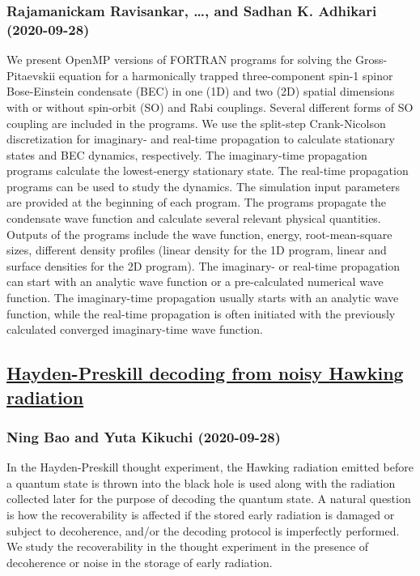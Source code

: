 \subsubsection*{Rajamanickam Ravisankar, \dots, and Sadhan K. Adhikari (2020-09-28)}
We present OpenMP versions of FORTRAN programs for solving the
Gross-Pitaevskii equation for a harmonically trapped three-component spin-1
spinor Bose-Einstein condensate (BEC) in one (1D) and two (2D) spatial
dimensions with or without spin-orbit (SO) and Rabi couplings. Several
different forms of SO coupling are included in the programs. We use the
split-step Crank-Nicolson discretization for imaginary- and real-time
propagation to calculate stationary states and BEC dynamics, respectively. The
imaginary-time propagation programs calculate the lowest-energy stationary
state. The real-time propagation programs can be used to study the dynamics.
The simulation input parameters are provided at the beginning of each program.
The programs propagate the condensate wave function and calculate several
relevant physical quantities. Outputs of the programs include the wave
function, energy, root-mean-square sizes, different density profiles (linear
density for the 1D program, linear and surface densities for the 2D program).
The imaginary- or real-time propagation can start with an analytic wave
function or a pre-calculated numerical wave function. The imaginary-time
propagation usually starts with an analytic wave function, while the real-time
propagation is often initiated with the previously calculated converged
imaginary-time wave function.

\subsection*{\href{http://arxiv.org/abs/2009.13493v1}{Hayden-Preskill decoding from noisy Hawking radiation}}
\subsubsection*{Ning Bao and Yuta Kikuchi (2020-09-28)}
In the Hayden-Preskill thought experiment, the Hawking radiation emitted
before a quantum state is thrown into the black hole is used along with the
radiation collected later for the purpose of decoding the quantum state. A
natural question is how the recoverability is affected if the stored early
radiation is damaged or subject to decoherence, and/or the decoding protocol is
imperfectly performed. We study the recoverability in the thought experiment in
the presence of decoherence or noise in the storage of early radiation.

